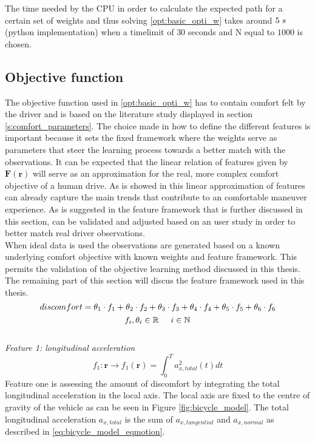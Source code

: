 The time needed by the CPU in order to calculate the expected path for a certain set of weights and thus solving \ref{opt:basic_opti_w} takes around $5\hspace{1mm}s$ (python implementation) when a timelimit of $30$ seconds and N equal to $1000$ is chosen. 


\subsection{Objective function}\label{s:obj}
The objective function used in \ref{opt:basic_opti_w} has to contain comfort felt by the driver and is based on the literature study displayed in section \ref{s:comfort_parameters}. The choice made in how to define the different features is important because it sets the fixed framework where the weights serve as parameters that steer the learning process towards a better match with the observations. It can be expected that the linear relation of features given by $\bm{F}(\bm{r})$ will serve as an approximation for the real, more complex comfort objective of a human drive. As is showed in \cite{Kuderer2015a} this linear approximation of features can already capture  the main trends that contribute to an comfortable maneuver experience. As is suggested in \cite{Kuderer2015a} the feature framework that is further discussed in this section, can be validated and adjusted based on an user study in order to better match real driver observations. \\

When ideal data is used the observations are generated based on a known underlying comfort objective with known weights and feature framework. This permits the validation of the objective learning method discussed in this thesis. The remaining part of this section will discus the feature framework used in this thesis.\\


\begin{equation}\label{eq:obj}
discomfort = \theta_1 \cdot f_1 +\theta_2 \cdot f_2 +\theta_3 \cdot f_3 +\theta_4 \cdot f_4 +\theta_5 \cdot f_5 +\theta_6 \cdot f_6 \\
\end{equation}
\[	f_i, \theta_i \in \mathbb{R} \hspace{5mm}
i \in \mathbb{N}\]\\


\textit{Feature 1: longitudinal acceleration}
\begin{equation}\label{eq:flong_acc}
f_{1}:\bm{r}\xrightarrow{}f_1(\bm{r})=\int_{0}^{T}a_{x,total}^{2}(t) dt
\end{equation}
Feature one is assessing the amount of discomfort by integrating the total longitudinal acceleration in the local axis. The local axis are fixed to the centre of gravity of the vehicle as can be seen in Figure \ref{fig:bicycle_model}. The total longitudinal acceleration  $a_{x,total} $ is the sum of  $ a_{x,tangential}$ and $a_{x,normal}$ as described in \ref{eq:bicycle_model_eqmotion}. \\


